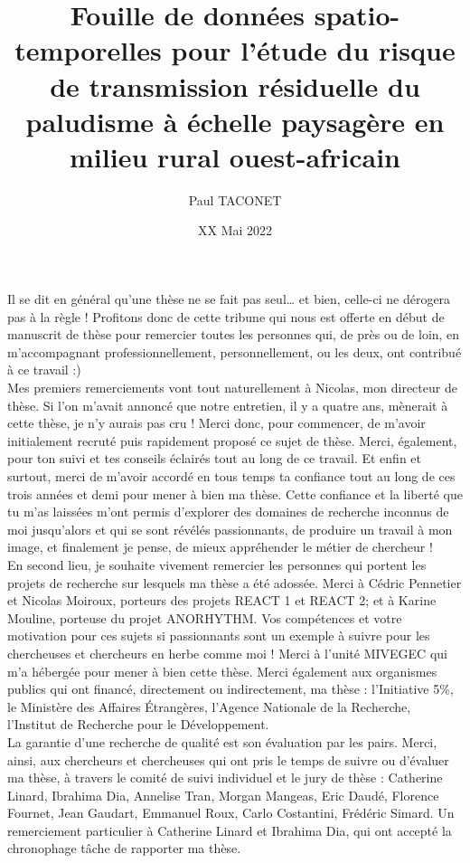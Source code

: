 \documentclass[12pt,twoside]{reedthesis}
\title{Fouille de données spatio-temporelles pour l'étude du risque de transmission résiduelle du paludisme à échelle paysagère en milieu rural ouest-africain}
\author{Paul TACONET}
\date{XX Mai 2022}
\begin{document}
  \maketitle

\frontmatter %
\pagestyle{empty} %
  \begin{acknowledgements}
    Il se dit en général qu'une thèse ne se fait pas seul\ldots{} et bien, celle-ci ne dérogera pas à la règle ! Profitons donc de cette tribune qui nous est offerte en début de manuscrit de thèse pour remercier toutes les personnes qui, de près ou de loin, en m'accompagnant professionnellement, personnellement, ou les deux, ont contribué à ce travail :)\\

    Mes premiers remerciements vont tout naturellement à Nicolas, mon directeur de thèse. Si l'on m'avait annoncé que notre entretien, il y a quatre ans, mènerait à cette thèse, je n'y aurais pas cru ! Merci donc, pour commencer, de m'avoir initialement recruté puis rapidement proposé ce sujet de thèse. Merci, également, pour ton suivi et tes conseils éclairés tout au long de ce travail. Et enfin et surtout, merci de m'avoir accordé en tous temps ta confiance tout au long de ces trois années et demi pour mener à bien ma thèse. Cette confiance et la liberté que tu m'as laissées m'ont permis d'explorer des domaines de recherche inconnus de moi jusqu'alors et qui se sont révélés passionnants, de produire un travail à mon image, et finalement je pense, de mieux appréhender le métier de chercheur !\\

    En second lieu, je souhaite vivement remercier les personnes qui portent les projets de recherche sur lesquels ma thèse a été adossée. Merci à Cédric Pennetier et Nicolas Moiroux, porteurs des projets REACT 1 et REACT 2; et à Karine Mouline, porteuse du projet ANORHYTHM. Vos compétences et votre motivation pour ces sujets si passionnants sont un exemple à suivre pour les chercheuses et chercheurs en herbe comme moi ! Merci à l'unité MIVEGEC qui m'a hébergée pour mener à bien cette thèse. Merci également aux organismes publics qui ont financé, directement ou indirectement, ma thèse : l'Initiative 5\%, le Ministère des Affaires Étrangères, l'Agence Nationale de la Recherche, l'Institut de Recherche pour le Développement.\\

    La garantie d'une recherche de qualité est son évaluation par les pairs. Merci, ainsi, aux chercheurs et chercheuses qui ont pris le temps de suivre ou d'évaluer ma thèse, à travers le comité de suivi individuel et le jury de thèse : Catherine Linard, Ibrahima Dia, Annelise Tran, Morgan Mangeas, Eric Daudé, Florence Fournet, Jean Gaudart, Emmanuel Roux, Carlo Costantini, Frédéric Simard. Un remerciement particulier à Catherine Linard et Ibrahima Dia, qui ont accepté la chronophage tâche de rapporter ma thèse.\\


\end{acknowledgements}
\end{document}
